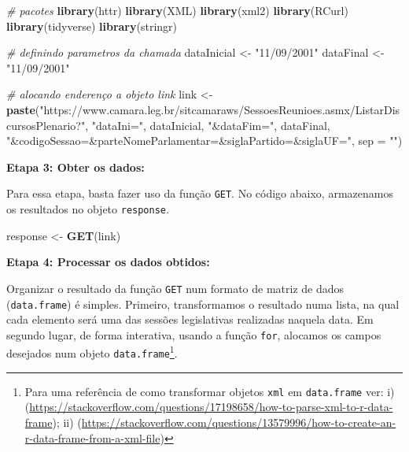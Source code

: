 \documentclass[]{book}
\newenvironment{Shaded}{\begin{snugshade}}{\end{snugshade}}
\newcommand{\CommentTok}[1]{\textcolor[rgb]{0.56,0.35,0.01}{\textit{#1}}}
\newcommand{\DataTypeTok}[1]{\textcolor[rgb]{0.13,0.29,0.53}{#1}}
\newcommand{\KeywordTok}[1]{\textcolor[rgb]{0.13,0.29,0.53}{\textbf{#1}}}
\newcommand{\NormalTok}[1]{#1}
\newcommand{\StringTok}[1]{\textcolor[rgb]{0.31,0.60,0.02}{#1}}
\begin{document}
\begin{Shaded}
\begin{Highlighting}[]
\CommentTok{# pacotes }
\KeywordTok{library}\NormalTok{(httr)}
\KeywordTok{library}\NormalTok{(XML)}
\KeywordTok{library}\NormalTok{(xml2)}
\KeywordTok{library}\NormalTok{(RCurl)}
\KeywordTok{library}\NormalTok{(tidyverse)}
\KeywordTok{library}\NormalTok{(stringr)}

\CommentTok{# definindo parametros da chamada}
\NormalTok{dataInicial <-}\StringTok{ "11/09/2001"} 
\NormalTok{dataFinal <-}\StringTok{ "11/09/2001"}

\CommentTok{# alocando enderenço a objeto link}
\NormalTok{link <-}\StringTok{ }\KeywordTok{paste}\NormalTok{(}\StringTok{"https://www.camara.leg.br/sitcamaraws/SessoesReunioes.asmx/ListarDiscursosPlenario?"}\NormalTok{,}
                \StringTok{"dataIni="}\NormalTok{, dataInicial,}
                \StringTok{"&dataFim="}\NormalTok{, dataFinal, }
                \StringTok{"&codigoSessao=&parteNomeParlamentar=&siglaPartido=&siglaUF="}\NormalTok{,}
                \DataTypeTok{sep =} \StringTok{""}\NormalTok{)}
\end{Highlighting}
\end{Shaded}

\textbf{Etapa 3: Obter os dados:}

Para essa etapa, basta fazer uso da função \texttt{GET}. No código abaixo, armazenamos os resultados no objeto \texttt{response}.

\begin{Shaded}
\begin{Highlighting}[]
\NormalTok{response <-}\StringTok{ }\KeywordTok{GET}\NormalTok{(link)}
\end{Highlighting}
\end{Shaded}

\textbf{Etapa 4: Processar os dados obtidos:}

Organizar o resultado da função \texttt{GET} num formato de matriz de dados (\texttt{data.frame}) é
simples. Primeiro, transformamos o resultado numa lista, na qual cada elemento será
uma das sessões legislativas realizadas naquela data. Em segundo lugar, de forma
interativa, usando a função \texttt{for}, alocamos os campos desejados num objeto \texttt{data.frame}\footnote{Para uma referência de como transformar objetos \texttt{xml} em \texttt{data.frame} ver: i) (\url{https://stackoverflow.com/questions/17198658/how-to-parse-xml-to-r-data-frame}); ii) (\url{https://stackoverflow.com/questions/13579996/how-to-create-an-r-data-frame-from-a-xml-file})}.
\end{document}

